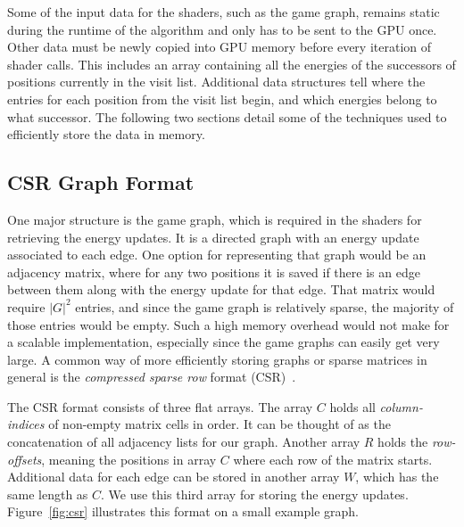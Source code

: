Some of the input data for the shaders, such as the game graph,
remains static during the runtime of the algorithm
and only has to be sent to the GPU once.
Other data must be newly copied into GPU memory before every iteration of
shader calls.
This includes an array containing all the energies of the successors of
positions currently in the visit list.
Additional data structures tell where the entries for each position from the
visit list begin,
and which energies belong to what successor.
The following two sections detail some of the techniques used to efficiently
store the data in memory.


\subsection{CSR Graph Format}

One major structure is the game graph,
which is required in the shaders for retrieving the energy updates.
It is a directed graph with an energy update associated to each edge.
One option for representing that graph would be an adjacency matrix,
where for any two positions it is saved if there is an edge between them
along with the energy update for that edge.
That matrix would require $|G|^2$ entries, and since the game graph is
relatively sparse, the majority of those entries would be empty.
Such a high memory overhead would not make for a scalable implementation,
especially since the game graphs can easily get very large.
A common way of more efficiently storing graphs or sparse matrices in general is
the \emph{compressed sparse row} format (CSR)~\cite{Merrill2015,Hijma2023}.

The CSR format consists of three flat arrays.
The array $C$ holds all \emph{column-indices} of non-empty matrix cells in order.
It can be thought of as the concatenation of all adjacency lists for our graph.
Another array $R$ holds the \emph{row-offsets}, meaning the positions in array
$C$ where each row of the matrix starts.
Additional data for each edge can be stored in another array $W$, which has the
same length as $C$.
We use this third array for storing the energy updates.
Figure~\ref{fig:csr} illustrates this format on a small example graph.

